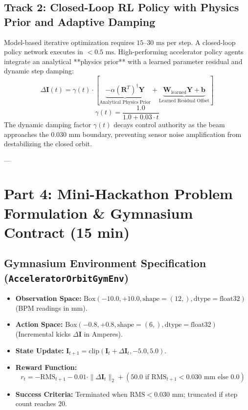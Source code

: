 \documentclass[11pt,a4paper]{article}
\begin{document}
\subsection{Track 2: Closed-Loop RL Policy with Physics Prior and Adaptive Damping}
Model-based iterative optimization requires $15$--$30\text{ ms}$ per step. A closed-loop policy network executes in $< 0.5\text{ ms}$.
High-performing accelerator policy agents integrate an analytical **physics prior** with a learned parameter residual and dynamic step damping:
\begin{equation}
    \Delta \mathbf{I}(t) = \gamma(t) \cdot \left[ \underbrace{- \alpha (\mathbf{R}^T)^\dagger \mathbf{Y}}_{\text{Analytical Physics Prior}} + \underbrace{\mathbf{W}_{\text{learned}}\mathbf{Y} + \mathbf{b}}_{\text{Learned Residual Offset}} \right]
\end{equation}
\begin{equation}
    \gamma(t) = \frac{1.0}{1.0 + 0.03 \cdot t}
\end{equation}
The dynamic damping factor $\gamma(t)$ decays control authority as the beam approaches the $0.030\text{ mm}$ boundary, preventing sensor noise amplification from destabilizing the closed orbit.

---

\section{Part 4: Mini-Hackathon Problem Formulation \& Gymnasium Contract (15 min)}

\subsection{Gymnasium Environment Specification (\texttt{AcceleratorOrbitGymEnv})}
\begin{itemize}
    \item \textbf{Observation Space:} $\text{Box}(-10.0, +10.0, \text{shape}=(12,), \text{dtype}=\text{float32})$ (BPM readings in mm).
    \item \textbf{Action Space:} $\text{Box}(-0.8, +0.8, \text{shape}=(6,), \text{dtype}=\text{float32})$ (Incremental kicks $\Delta \mathbf{I}$ in Amperes).
    \item \textbf{State Update:} $\mathbf{I}_{t+1} = \text{clip}(\mathbf{I}_t + \Delta \mathbf{I}_t, -5.0, 5.0)$.
    \item \textbf{Reward Function:}
    \begin{equation}
        r_t = - \text{RMS}_{t+1} - 0.01 \cdot \|\Delta \mathbf{I}_t\|_2 + (50.0 \text{ if } \text{RMS}_{t+1} < 0.030\text{ mm} \text{ else } 0.0)
    \end{equation}
    \item \textbf{Success Criteria:} Terminated when $\text{RMS} < 0.030\text{ mm}$; truncated if step count reaches $20$.
\end{itemize}
\end{document}
